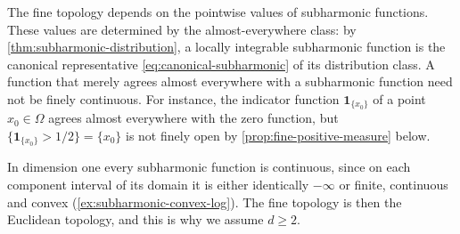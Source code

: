 The fine topology depends on the pointwise values of subharmonic functions. These values are determined by the almost-everywhere class: by \cref{thm:subharmonic-distribution}, a locally integrable subharmonic function is the canonical representative \eqref{eq:canonical-subharmonic} of its distribution class. A function that merely agrees almost everywhere with a subharmonic function need not be finely continuous. For instance, the indicator function $\mathbf1_{\{x_0\}}$ of a point $x_0\in\Omega$ agrees almost everywhere with the zero function, but $\{\mathbf1_{\{x_0\}}>1/2\}=\{x_0\}$ is not finely open by \cref{prop:fine-positive-measure} below.

In dimension one every subharmonic function is continuous, since on each component interval of its domain it is either identically $-\infty$ or finite, continuous and convex (\cref{ex:subharmonic-convex-log}). The fine topology is then the Euclidean topology, and this is why we assume $d\geq2$.


